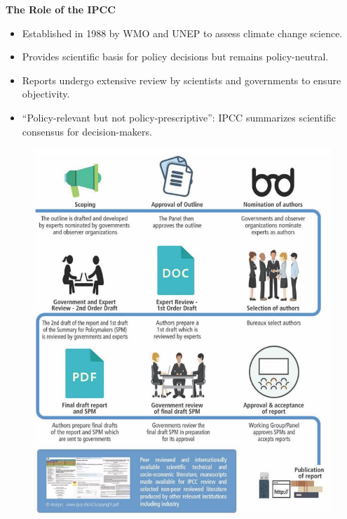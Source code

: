 \documentclass[fontsize=8pt, a4paper, landscape, fleqn]{scrartcl}
\renewcommand{\subsection}[1]{%
    \noindent\colorbox{subsectioncolor}{%
        \parbox{\dimexpr\columnwidth-2\fboxsep}{\color{white}\textbf{#1}}}%
    \vspace{0.5mm}%
}
\begin{document}
\begin{multicols*}{3}[\raggedcolumns]
\subsection{The Role of the IPCC}
\begin{itemize}
    \item Established in 1988 by WMO and UNEP to assess climate change science.
    \item Provides scientific basis for policy decisions but remains policy-neutral.
    \item Reports undergo extensive review by scientists and governments to ensure objectivity.
    \item “Policy-relevant but not policy-prescriptive”: IPCC summarizes scientific consensus for decision-makers.
\end{itemize}
\begin{figure}[H]
    \centering
    \includegraphics[width=0.8\linewidth]{Workings_of_IPCC.png}
\end{figure}

\end{multicols*}
\end{document}
